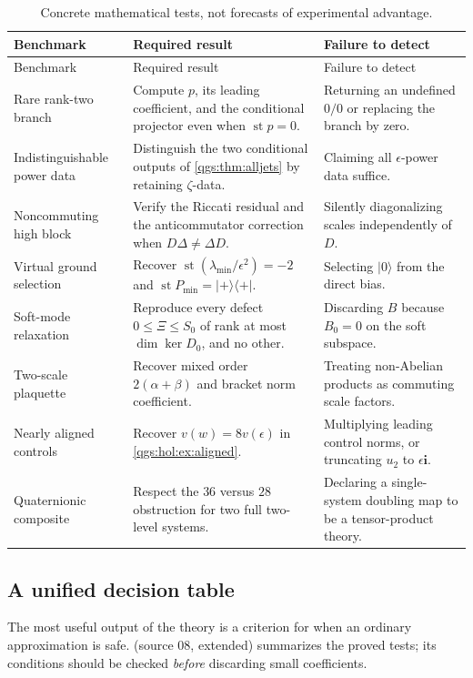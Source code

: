 \documentclass[11pt,oneside]{article}
\numberwithin{equation}{section}
\theoremstyle{plain}
\theoremstyle{definition}
\theoremstyle{remark}
\newcommand{\qi}{\mathbf i}
\DeclareMathOperator{\st}{st}
\newcommand{\ket}[1]{\lvert#1\rangle}
\newcommand{\bra}[1]{\langle#1\rvert}
\newcommand{\proj}[1]{\ket{#1}\!\bra{#1}}
\begin{document}
\begin{longtable}{@{}L{0.25\textwidth}L{0.40\textwidth}L{0.27\textwidth}@{}}
\caption{Concrete mathematical tests, not forecasts of experimental advantage.}\label{qgs:tab:benchmarks}\\
\toprule
Benchmark & Required result & Failure to detect\\
\midrule
\endfirsthead
\toprule
Benchmark & Required result & Failure to detect\\
\midrule
\endhead
\bottomrule
\endfoot
Rare rank-two branch
& Compute $p$, its leading coefficient, and the conditional projector even when $\st p=0$.
& Returning an undefined $0/0$ or replacing the branch by zero.\\[3pt]
Indistinguishable power data
& Distinguish the two conditional outputs of \cref{qgs:thm:alljets} by retaining $\zeta$-data.
& Claiming all $\epsilon$-power data suffice.\\[3pt]
Noncommuting high block
& Verify the Riccati residual and the anticommutator correction when $D\Delta\ne\Delta D$.
& Silently diagonalizing scales independently of $D$.\\[3pt]
Virtual ground selection
& Recover $\st(\lambda_{\min}/\epsilon^2)=-2$ and $\st P_{\min}=\proj{+}$.
& Selecting $\ket0$ from the direct bias.\\[3pt]
Soft-mode relaxation
& Reproduce every defect $0\le\Xi\le S_0$ of rank at most $\dim\ker D_0$, and no other.
& Discarding $B$ because $B_0=0$ on the soft subspace.\\[3pt]
Two-scale plaquette
& Recover mixed order $2(\alpha+\beta)$ and bracket norm coefficient.
& Treating non-Abelian products as commuting scale factors.\\[3pt]
Nearly aligned controls
& Recover $v(w)=8v(\epsilon)$ in \cref{qgs:hol:ex:aligned}.
& Multiplying leading control norms, or truncating $u_2$ to $\epsilon\qi$.\\[3pt]
Quaternionic composite
& Respect the $36$ versus $28$ obstruction for two full two-level systems.
& Declaring a single-system doubling map to be a tensor-product theory.\\
\end{longtable}

\subsection{A unified decision table}
The most useful output of the theory is a criterion for when an ordinary approximation is safe.  (source 08, extended) summarizes the proved tests; its conditions should be checked \emph{before} discarding small coefficients.
\end{document}
